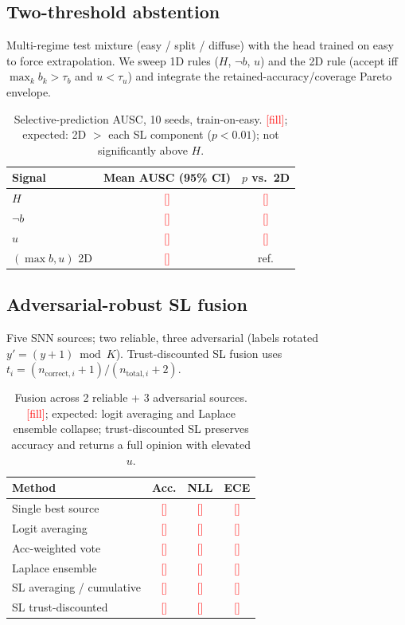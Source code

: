 \documentclass[11pt]{article}
\newcommand{\todo}[1]{\textcolor{red}{[#1]}}
\begin{document}
\subsection{Two-threshold abstention}
Multi-regime test mixture (easy / split / diffuse) with the head trained on easy to
force extrapolation. We sweep 1D rules ($H$, $\neg b$, $u$) and the 2D rule (accept iff
$\max_k b_k>\tau_b$ and $u<\tau_u$) and integrate the retained-accuracy/coverage Pareto
envelope.
\begin{table}[h]\centering
\caption{Selective-prediction AUSC, 10 seeds, train-on-easy. \todo{fill}; expected:
2D $>$ each SL component ($p<0.01$); not significantly above $H$.}
\begin{tabular}{lcc}
\toprule
Signal & Mean AUSC (95\% CI) & $p$ vs.\ 2D \\
\midrule
$H$ & \todo{} & \todo{} \\
$\neg b$ & \todo{} & \todo{} \\
$u$ & \todo{} & \todo{} \\
$(\max b,u)$ 2D & \todo{} & ref. \\
\bottomrule
\end{tabular}
\end{table}

\subsection{Adversarial-robust SL fusion}
Five SNN sources; two reliable, three adversarial (labels rotated $y'=(y+1)\bmod K$).
Trust-discounted SL fusion uses $t_i=(n_{\text{correct},i}+1)/(n_{\text{total},i}+2)$.
\begin{table}[h]\centering
\caption{Fusion across 2 reliable + 3 adversarial sources. \todo{fill}; expected: logit
averaging and Laplace ensemble collapse; trust-discounted SL preserves accuracy and
returns a full opinion with elevated $u$.}
\begin{tabular}{lccc}
\toprule
Method & Acc. & NLL & ECE \\
\midrule
Single best source & \todo{} & \todo{} & \todo{} \\
Logit averaging & \todo{} & \todo{} & \todo{} \\
Acc-weighted vote & \todo{} & \todo{} & \todo{} \\
Laplace ensemble & \todo{} & \todo{} & \todo{} \\
SL averaging / cumulative & \todo{} & \todo{} & \todo{} \\
SL trust-discounted & \todo{} & \todo{} & \todo{} \\
\bottomrule
\end{tabular}
\end{table}
\end{document}
